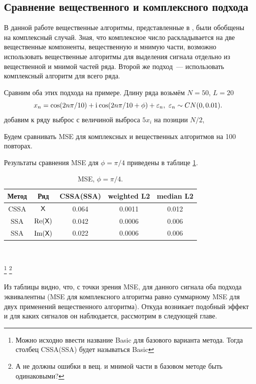 \documentclass[specialist,
               substylefile = spbu.rtx,
               subf,href,colorlinks=true, 12pt]{disser}
\begin{document}
\subsection{Сравнение вещественного и комплексного подхода} \label{sec:comp}

В данной работе вещественные алгоритмы, представленные в \cite{Tretyakova20}, были обобщены на комплексный случай. Зная, что комплексное число раскладывается на две вещественные компоненты, вещественную и мнимую части, возможно использовать вещественные алгоритмы для выделения сигнала отдельно из вещественной и мнимой частей ряда. Второй же подход~--- использовать комплексный алгоритм для всего ряда.

Сравним оба этих подхода на примере.
Длину ряда возьмём $N = 50$, $L = 20$
$$x_n = \cos(2n\pi/10) + \mathrm{i}\mkern1mu\cos(2n\pi/10 + \phi) + \varepsilon_n, ~ \varepsilon_n \sim CN(0,0.01).$$
добавим к ряду выброс с величиной выброса $5x_i$ на позиции $N/2$,

Будем сравнивать MSE для комплексных и вещественных алгоритмов на 100 повторах.

Результаты сравнения MSE для $\phi = \pi / 4$ приведены в таблице \ref{tab:th_ex}.
\begin{table}[H]
	\caption{MSE, $\phi = \pi / 4$.}
	\label{tab:th_ex}
	\begin{center}
		\begin{tabular}{|c|c|c|c|c|}
			\hline
			Метод & Ряд & CSSA(SSA) & weighted L2 & median L2\\
			\hline
			CSSA & $\textsf{X}$ & 0.064 & 0.0011 & 0.012\\
			\hline
			SSA & $\Re(\textsf{X})$ & 0.042 & 0.0006 &   0.006\\
			\hline
			SSA & $\Im(\textsf{X})$ & 0.022   & 0.0006 &   0.006\\
			\hline
		\end{tabular} \\
	\end{center}
\end{table}
\footnote{Можно исходно ввести название Basic для базового варианта метода. Тогда столбец CSSA(SSA) будет называться Basic}
\footnote{А не должны ошибки в вещ. и мнимой части в базовом методе быть одинаковыми?}

Из таблицы видно, что, с точки зрения MSE, для данного сигнала оба подхода эквивалентны (MSE для комплексного алгоритма равно суммарному MSE для двух применений вещественного алгоритма). Откуда возникает подобный эффект и для каких сигналов он наблюдается, рассмотрим в следующей главе.
\end{document}
